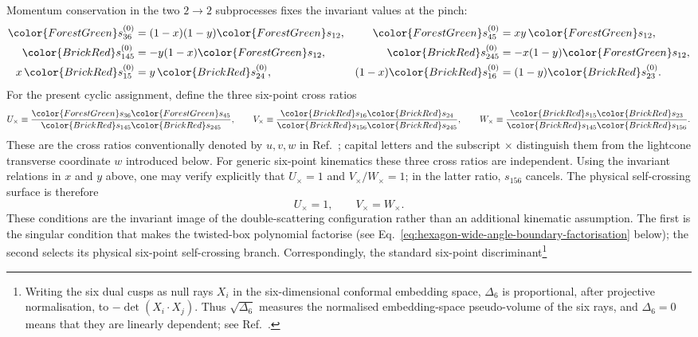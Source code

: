 \documentclass[a4paper,11pt]{article}
\newcommand{\PosInv}[1]{{\color{ForestGreen}#1}}
\newcommand{\NegInv}[1]{{\color{BrickRed}#1}}
\begin{document}
Momentum conservation in the two \(2\to2\) subprocesses fixes the invariant
values at the pinch:
\begin{align}
 \PosInv{s_{36}^{(0)}}&=(1-x)(1-y)\PosInv{s_{12}},&
 \PosInv{s_{45}^{(0)}}&=xy\,\PosInv{s_{12}},\nonumber\\
 \NegInv{s_{145}^{(0)}}&=-y(1-x)\PosInv{s_{12}},&
 \NegInv{s_{245}^{(0)}}&=-x(1-y)\PosInv{s_{12}},\nonumber\\
 x\,\NegInv{s_{15}^{(0)}}&=y\,\NegInv{s_{24}^{(0)}},&
 (1-x)\NegInv{s_{16}^{(0)}}&=(1-y)\NegInv{s_{23}^{(0)}}.
 \label{eq:hexagon-self-crossing-pinched-invariants}
\end{align}
For the present cyclic assignment, define the three six-point cross ratios
\begin{equation}
 U_\times\equiv
 \frac{\PosInv{s_{36}}\PosInv{s_{45}}}
      {\NegInv{s_{145}}\NegInv{s_{245}}},
 \qquad
 V_\times\equiv
 \frac{\NegInv{s_{16}}\NegInv{s_{24}}}
      {\NegInv{s_{156}}\NegInv{s_{245}}},
 \qquad
 W_\times\equiv
 \frac{\NegInv{s_{15}}\NegInv{s_{23}}}
      {\NegInv{s_{145}}\NegInv{s_{156}}}.
 \label{eq:hexagon-self-crossing-ratios}
\end{equation}
These are the cross ratios conventionally denoted by \(u,v,w\) in
Ref.~\cite{Dixon:2016selfcross}; capital letters and the subscript \(\times\)
distinguish them from the lightcone transverse coordinate \(w\) introduced
below.  For generic six-point kinematics these three cross ratios are
independent.  Using the invariant relations in \(x\) and \(y\) above, one may
verify explicitly that \(U_\times=1\) and \(V_\times/W_\times=1\); in the
latter ratio, \(s_{156}\) cancels.  The physical self-crossing surface is
therefore
\begin{equation}
 U_\times=1,\qquad V_\times=W_\times.
 \label{eq:hexagon-self-crossing-surface}
\end{equation}
These conditions are the invariant image of the double-scattering
configuration rather than an additional kinematic assumption.  The first is
the singular condition that makes the twisted-box
polynomial factorise (see
Eq.~\eqref{eq:hexagon-wide-angle-boundary-factorisation} below); the second
selects its physical six-point
self-crossing branch.  Correspondingly, the standard six-point discriminant\footnote{Writing
the six dual cusps as null rays \(X_i\) in the six-dimensional conformal
embedding space, \(\Delta_6\) is proportional, after projective normalisation,
to \(-\det(X_i\cdot X_j)\). Thus \(\sqrt{\Delta_6}\) measures the
normalised embedding-space pseudo-volume of the six rays, and
\(\Delta_6=0\) means that they are linearly dependent; see
Ref.~\cite{Bourjaily:2018aeq}.}
\end{document}
